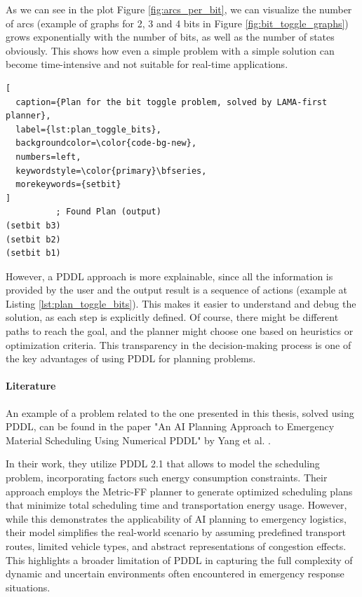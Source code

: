 As we can see in the plot Figure \ref{fig:arcs_per_bit}, we can visualize the
number of arcs (example of graphs for 2, 3 and 4 bits in Figure
\ref{fig:bit_toggle_graphs}) grows exponentially with the number of bits, as
well as the number of states obviously. This shows how even a simple problem with
a simple solution can become time-intensive and not suitable for real-time applications.

\begin{lstlisting}[
  caption={Plan for the bit toggle problem, solved by LAMA-first planner},
  label={lst:plan_toggle_bits},
  backgroundcolor=\color{code-bg-new},
  numbers=left,
  keywordstyle=\color{primary}\bfseries,
  morekeywords={setbit}
]
          ; Found Plan (output)
(setbit b3)
(setbit b2)
(setbit b1)
\end{lstlisting}

However, a PDDL approach is more explainable, since all the information is
provided by the user and the output result is a sequence of actions (example at Listing
\ref{lst:plan_toggle_bits}). This makes it easier to understand and debug the solution,
as each step is explicitly defined. Of course, there might be different paths to
reach the goal, and the planner might choose one based on heuristics or optimization
criteria. This transparency in the decision-making process is one of the key
advantages of using PDDL for planning problems.

\paragraph{Literature}
An example of a problem related to the one presented in this thesis, solved
using PDDL, can be found in the paper "An AI Planning Approach to Emergency
Material Scheduling Using Numerical PDDL" by Yang et al. \cite{Yang2022}.

In their work, they utilize PDDL 2.1 that allows to model the scheduling problem,
incorporating factors such energy consumption constraints. Their approach employs
the Metric-FF planner to generate optimized scheduling plans that minimize total
scheduling time and transportation energy usage. However, while this demonstrates
the applicability of AI planning to emergency logistics, their model simplifies
the real-world scenario by assuming predefined transport routes, limited vehicle
types, and abstract representations of congestion effects. This highlights a broader
limitation of PDDL in capturing the full complexity of dynamic and uncertain environments
often encountered in emergency response situations.

